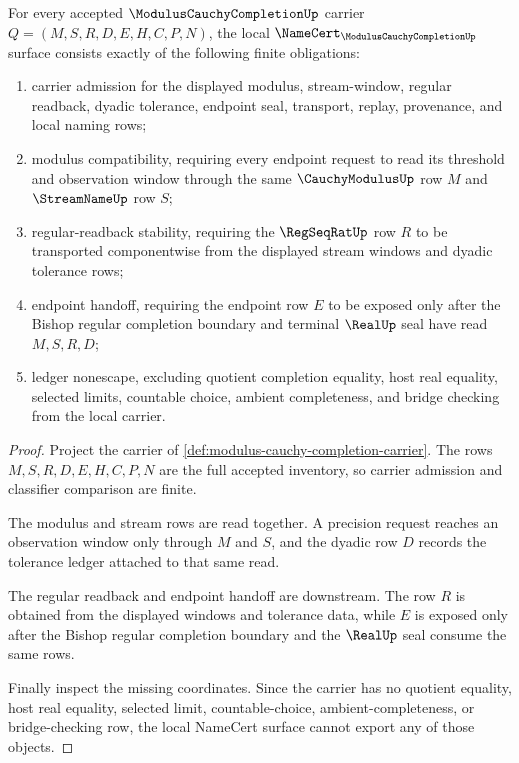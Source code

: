 \begin{theorem}
\label{thm:modulus-cauchy-completion-namecert-obligations}
For every accepted $\ModulusCauchyCompletionUp$ carrier $Q=(M,S,R,D,E,H,C,P,N)$, the local $\NameCert_{\ModulusCauchyCompletionUp}$ surface consists exactly of the following finite obligations:
\begin{enumerate}
\item carrier admission for the displayed modulus, stream-window, regular readback, dyadic tolerance, endpoint seal, transport, replay, provenance, and local naming rows;
\item modulus compatibility, requiring every endpoint request to read its threshold and observation window through the same $\CauchyModulusUp$ row $M$ and $\StreamNameUp$ row $S$;
\item regular-readback stability, requiring the $\RegSeqRatUp$ row $R$ to be transported componentwise from the displayed stream windows and dyadic tolerance rows;
\item endpoint handoff, requiring the endpoint row $E$ to be exposed only after the Bishop regular completion boundary and terminal $\RealUp$ seal have read $M,S,R,D$;
\item ledger nonescape, excluding quotient completion equality, host real equality, selected limits, countable choice, ambient completeness, and bridge checking from the local carrier.
\end{enumerate}
\end{theorem}
\begin{proof}
Project the carrier of \autoref{def:modulus-cauchy-completion-carrier}. The rows $M,S,R,D,E,H,C,P,N$ are the full accepted inventory, so carrier admission and classifier comparison are finite.

The modulus and stream rows are read together. A precision request reaches an observation window only through $M$ and $S$, and the dyadic row $D$ records the tolerance ledger attached to that same read.

The regular readback and endpoint handoff are downstream. The row $R$ is obtained from the displayed windows and tolerance data, while $E$ is exposed only after the Bishop regular completion boundary and the $\RealUp$ seal consume the same rows.

Finally inspect the missing coordinates. Since the carrier has no quotient equality, host real equality, selected limit, countable-choice, ambient-completeness, or bridge-checking row, the local NameCert surface cannot export any of those objects.
\end{proof}

